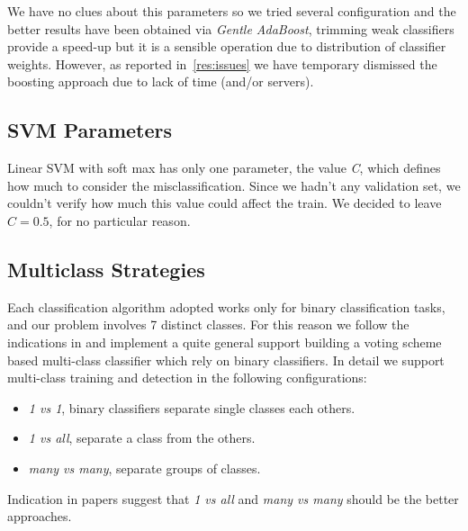 We have no clues about this parameters so we tried several configuration and the better results have been obtained via \emph{Gentle AdaBoost}, trimming weak classifiers provide a speed-up but it is a sensible operation due to distribution of classifier weights. However, as reported in~\ref{res:issues} we have temporary dismissed the boosting approach due to lack of time (and/or servers).

\subsection{SVM Parameters}

Linear SVM with soft max has only one parameter, the value \emph{C}, which
defines how much to consider the misclassification. Since we hadn't any
validation set, we couldn't verify how much this value could affect the train.
We decided to leave $C=0.5$, for no particular reason.

\subsection{Multiclass Strategies}

Each classification algorithm adopted works only for binary classification tasks, and our problem involves 7 distinct classes. For this reason we follow the indications in \cite{Littlewort04dynamicsof, Bartlett06fullyautomatic} and implement a quite general support building a voting scheme based multi-class classifier which rely on binary classifiers. 
In detail we support multi-class training and detection in the following configurations:

\begin{itemize}
\item \emph{1 vs 1}, binary classifiers separate single classes each others.
\item \emph{1 vs all}, separate a class from the others.
\item \emph{many vs many}, separate groups of classes.
\end{itemize}

Indication in papers suggest that \emph{1 vs all} and \emph{many vs many} should be the better approaches.
